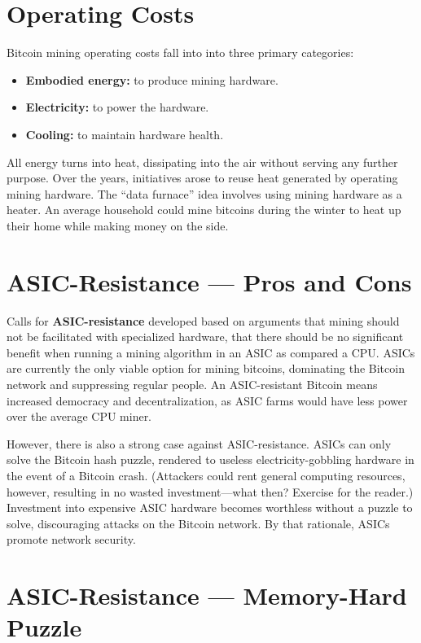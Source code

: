 \documentclass[full.tex]{subfiles}
\begin{document}
    \section*{Operating Costs}
    
     \noindent Bitcoin mining operating costs fall into into three primary categories:
     \begin{itemize}
        \item \textbf{Embodied energy:} to produce mining hardware. 
        \item \textbf{Electricity:} to power the hardware. 
        \item \textbf{Cooling:} to maintain hardware health. 
    \end{itemize}
    
    All energy turns into heat, dissipating into the air without serving any further purpose. Over the years, initiatives arose to reuse heat generated by operating mining hardware. The ``data furnace'' idea involves using mining hardware as a heater. An average household could mine bitcoins during the winter to heat up their home while making money on the side.
    
    \section*{ASIC-Resistance --- Pros and Cons}
    
    Calls for \textbf{ASIC-resistance} developed based on arguments that mining should not be facilitated with specialized hardware, that there should be no significant benefit when running a mining algorithm in an ASIC as compared a CPU. ASICs are currently the only viable option for mining bitcoins, dominating the Bitcoin network and suppressing regular people. An ASIC-resistant Bitcoin means increased democracy and decentralization, as ASIC farms would have less power over the average CPU miner.
    
    However, there is also a strong case against ASIC-resistance. ASICs can only solve the Bitcoin hash puzzle, rendered to useless electricity-gobbling hardware in the event of a Bitcoin crash. (Attackers could rent general computing resources, however, resulting in no wasted investment---what then? Exercise for the reader.) Investment into expensive ASIC hardware becomes worthless without a puzzle to solve, discouraging attacks on the Bitcoin network. By that rationale, ASICs promote network security.
    
    \section*{ASIC-Resistance --- Memory-Hard Puzzle}
    
\end{document}
